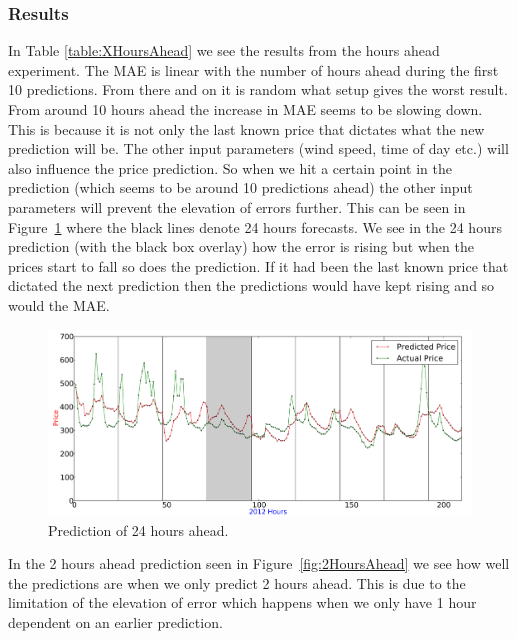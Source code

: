\subsubsection{Results}
In Table \ref{table:XHoursAhead} we see the results from the hours ahead experiment. The MAE is linear with the number of hours ahead during the first 10 predictions. From there and on it is random what setup gives the worst result. From around 10 hours ahead the increase in MAE seems to be slowing down. This is because it is not only the last known price that dictates what the new prediction will be. The other input parameters (wind speed, time of day etc.) will also influence the price prediction. So when we hit a certain point in the prediction (which seems to be around 10 predictions ahead) the other input parameters will prevent the elevation of errors further. This can be seen in Figure~\ref{fig:24HoursAhead_elevationOfError} where the black lines denote 24 hours forecasts. We see in the 24 hours prediction (with the black box overlay) how the error is rising but when the prices start to fall so does the prediction. If it had been the last known price that dictated the next prediction then the predictions would have kept rising and so would the MAE.

\begin{figure}[H]
\centering
\includegraphics[width=\linewidth]{billeder/PriceExperimentalAnalysis/24HoursAhead_ElevationOfErrorExample.png}
\caption{Prediction of 24 hours ahead.}
\label{fig:24HoursAhead_elevationOfError}
\end{figure}

In the 2 hours ahead prediction seen in Figure~\ref{fig:2HoursAhead} we see how well the predictions are when we only predict 2 hours ahead. This is due to the limitation of the elevation of error which happens when we only have 1 hour dependent on an earlier prediction.

